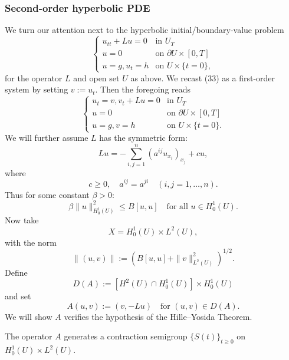 \subsubsection{Second-order hyperbolic PDE}

We turn our attention next to the hyperbolic initial/boundary-value problem
\[
\begin{cases}
u_{tt} + Lu = 0 & \text{in } U_T \\
u = 0 & \text{on } \partial U \times [0,T] \\
u = g, u_t = h & \text{on } U \times \{t = 0\},
\end{cases}
\tag{33}
\]
for the operator $L$ and open set $U$ as above. We recast (33) as a first-order system by setting $v := u_t$. Then the foregoing reads
\[
\begin{cases}
u_t = v, v_t + Lu = 0 & \text{in } U_T \\
u = 0 & \text{on } \partial U \times [0,T] \\
u = g, v = h & \text{on } U \times \{t = 0\}.
\end{cases}
\]
We will further assume $L$ has the symmetric form:
\[
Lu = -\sum_{i,j=1}^n (a^{ij}u_{x_i})_{x_j} + cu,
\]
where
\[
c \geq 0, \quad a^{ij} = a^{ji} \quad (i,j = 1,\ldots,n).
\tag{34}
\]
Thus for some constant $\beta > 0$:
\[
\beta \|u\|^2_{H^1_0(U)} \leq B[u,u] \quad \text{for all } u \in H^1_0(U).
\tag{35}
\]
Now take
\[
X = H^1_0(U) \times L^2(U),
\]
with the norm
\[
\|(u,v)\| := (B[u,u] + \|v\|^2_{L^2(U)})^{1/2}.
\tag{36}
\]
Define
\[
D(A) := [H^2(U) \cap H^1_0(U)] \times H^1_0(U)
\]
and set
\[
A(u,v) := (v,-Lu) \quad \text{for } (u,v) \in D(A).
\tag{37}
\]
We will show $A$ verifies the hypothesis of the Hille--Yosida Theorem.

\begin{theorem}
\label{thm:hyperbolic-pde-as-semigroup}
The operator $A$ generates a contraction semigroup $\{S(t)\}_{t \geq 0}$ on $H_0^1(U) \times L^2(U)$.
\end{theorem}

